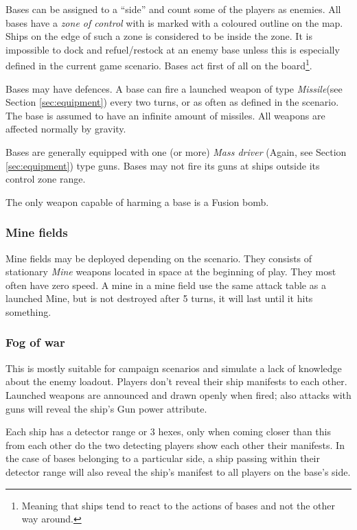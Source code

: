 \documentclass[a4paper,12pt,notitlepage,twocolumn]{article}
\begin{document}
Bases can be assigned to a ``side'' and count some of the players as
enemies. All bases have a \emph{zone of control} with is marked with a
coloured outline on the map. Ships on the edge of such a zone is
considered to be inside the zone. It is impossible to dock and
refuel/restock at an enemy base unless this is especially defined in
the current game scenario. Bases act first of all on the
board\footnote{Meaning that ships tend to react to the actions of bases and
  not the other way around.}. 

Bases may have defences. A base can fire
a launched weapon of type \emph{Missile}(see Section
\ref{sec:equipment}) every two turns, or as often as defined in the
scenario. The base is assumed to have an infinite amount of missiles. 
All weapons are affected normally by gravity. 

Bases are generally equipped with one (or more) \emph{Mass driver}
(Again, see Section \ref{sec:equipment})
type guns. Bases may not fire its guns at ships outside its control
zone range.  

The only weapon capable of harming a base is a Fusion bomb. 

\subsubsection*{Mine fields}

Mine fields may be deployed depending on the scenario. They consists
of stationary \emph{Mine} weapons located in space at the
beginning of play. They most often have zero speed. A mine in a mine
field use the same attack table as a launched Mine, but is not
destroyed after 5 turns, it will last until it hits something. 

\subsubsection*{Fog of war}

This is mostly suitable for campaign scenarios and simulate a lack of
knowledge about the enemy loadout. Players don't reveal their ship manifests to each
other. Launched weapons are announced and drawn openly when fired;
also attacks with guns will reveal the ship's Gun power attribute. 

Each ship has a detector range or 3 hexes, only when coming closer
than this from each other do the two detecting players show each other
their manifests.  In the case of bases belonging to a
particular side, a ship passing within their detector range will also
reveal the ship's manifest to all players on the base's side. 
\end{document}
